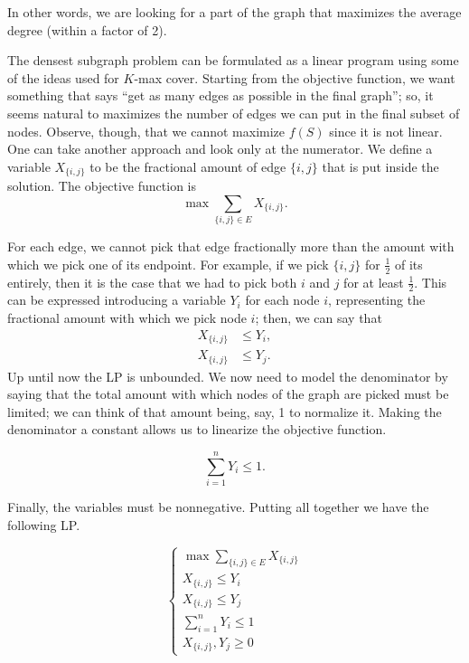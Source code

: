 In other words, we are looking for a part of the graph that maximizes the average degree (within a factor of 2).

The densest subgraph problem can be formulated as a linear program using some of the ideas used for $K$-max cover. Starting from the objective function, we want something that says ``get as many edges as possible in the final graph''; so, it seems natural to maximizes the number of edges we can put in the final subset of nodes. Observe, though, that we cannot maximize $f(S)$ since it is not linear. One can take another approach and look only at the numerator. We define a variable $X_{\{i, j\}}$ to be the fractional amount of edge $\{i, j\}$ that is put inside the solution. The objective function is
\begin{equation}
\max\sum_{\{i, j\} \in E}X_{\{i, j\}}.
\end{equation}

For each edge, we cannot pick that edge fractionally more than the amount with which we pick one of its endpoint. For example, if we pick $\{i, j\}$ for $\frac{1}{2}$ of its entirely, then it is the case that we had to pick both $i$ and $j$ for at least $\frac{1}{2}$. This can be expressed introducing a variable $Y_i$ for each node $i$, representing the fractional amount with which we pick node $i$; then, we can say that
\begin{align}\label{eq:x_size_constraint}
X_{\{i, j\}} &\leq Y_i,\\
X_{\{i, j\}} &\leq Y_j.
\end{align}
Up until now the LP is unbounded. We now need to model the denominator by saying that the total amount with which nodes of the graph are picked must be limited; we can think of that amount being, say, 1 to normalize it. Making the denominator a constant allows us to linearize the objective function.

\begin{equation}\label{eq:dsg_denominator_constraint}
\sum_{i=1}^n Y_i \leq 1.
\end{equation}

Finally, the variables must be nonnegative. Putting all together we have the following LP.

\begin{equation}\label{lp_densest_subg}
\begin{cases}
\max\sum_{\{i, j\} \in E}X_{\{i, j\}}\\
X_{\{i, j\}} \leq Y_i\\
X_{\{i, j\}} \leq Y_j\\
\sum_{i=1}^n Y_i \leq 1\\
X_{\{i, j\}}, Y_j \geq 0
\end{cases}
\end{equation}

